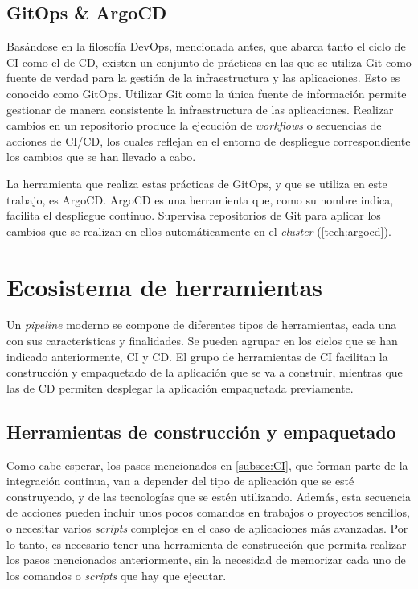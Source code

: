 \subsection*{GitOps \& ArgoCD}

Basándose en la filosofía DevOps, mencionada antes, que abarca tanto el ciclo de CI como el de CD, existen un conjunto de prácticas en las que se utiliza Git como fuente de verdad para la gestión de la infraestructura y las aplicaciones. Esto es conocido como GitOps\cite{gitops}. Utilizar Git como la única fuente de información permite gestionar de manera consistente la infraestructura de las aplicaciones. Realizar cambios en un repositorio produce la ejecución de \textit{workflows} o secuencias de acciones de CI/CD, los cuales reflejan en el entorno de despliegue correspondiente los cambios que se han llevado a cabo.

La herramienta que realiza estas prácticas de GitOps, y que se utiliza en este trabajo, es ArgoCD\cite{argocd}. ArgoCD es una herramienta que, como su nombre indica, facilita el despliegue continuo. Supervisa repositorios de Git para aplicar los cambios que se realizan en ellos automáticamente en el \textit{cluster} (\ref{tech:argocd}).

\section{Ecosistema de herramientas}

Un \textit{pipeline} moderno se compone de diferentes tipos de herramientas, cada una con sus características y finalidades. Se pueden agrupar en los ciclos que se han indicado anteriormente, CI y CD. El grupo de herramientas de CI facilitan la construcción y empaquetado de la aplicación que se va a construir, mientras que las de CD permiten desplegar la aplicación empaquetada previamente.

\subsection*{Herramientas de construcción y empaquetado}

Como cabe esperar, los pasos mencionados en \ref{subsec:CI}, que forman parte de la integración continua, van a depender del tipo de aplicación que se esté construyendo, y de las tecnologías que se estén utilizando. Además, esta secuencia de acciones pueden incluir unos pocos comandos en trabajos o proyectos sencillos, o necesitar varios \textit{scripts} complejos en el caso de aplicaciones más avanzadas. Por lo tanto, es necesario tener una herramienta de construcción que permita realizar los pasos mencionados anteriormente, sin la necesidad de memorizar cada uno de los comandos o \textit{scripts} que hay que ejecutar.

